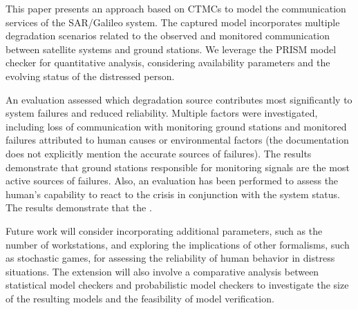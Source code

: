 This paper presents an approach based on CTMCs to model the communication services of the SAR/Galileo system. The captured model incorporates multiple degradation scenarios related to the observed and monitored communication between satellite systems and ground stations. We leverage the PRISM model checker for quantitative analysis, considering availability parameters and the evolving status of the distressed person.


An evaluation assessed which degradation source contributes most significantly to system failures and reduced reliability. Multiple factors were investigated, including loss of communication with monitoring ground stations and monitored failures attributed to human causes or environmental factors (the documentation does not explicitly mention the accurate sources of failures). The results demonstrate that ground stations responsible for monitoring signals are the most active sources of failures. Also, an evaluation has been performed to assess the human's capability to react to the crisis in conjunction with the system status. The results demonstrate that the . 

Future work will consider incorporating additional parameters, such as the number of workstations, and exploring the implications of other formalisms, such as stochastic games, for assessing the reliability of human behavior in distress situations. The extension will also involve a comparative analysis between statistical model checkers and probabilistic model checkers to investigate the size of the resulting models and the feasibility of model verification.